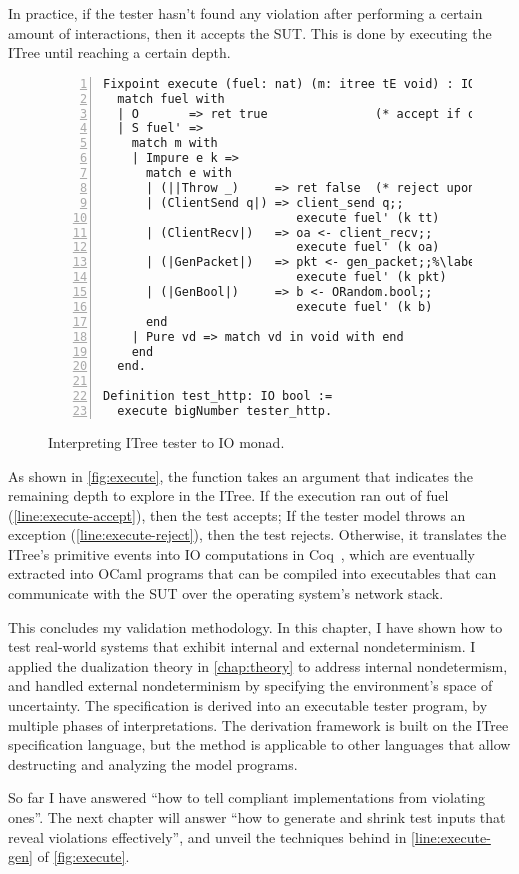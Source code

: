 In practice, if the tester hasn't found any violation after performing a certain
amount of interactions, then it accepts the SUT.  This is done by executing the
ITree until reaching a certain depth.

\begin{figure}
\begin{lstlisting}[numbers=left]
Fixpoint execute (fuel: nat) (m: itree tE void) : IO bool :=
  match fuel with
  | O       => ret true               (* accept if out of fuel *)%\label{line:execute-accept}%
  | S fuel' =>
    match m with
    | Impure e k =>
      match e with
      | (||Throw _)     => ret false  (* reject upon exception *)%\label{line:execute-reject}%
      | (ClientSend q|) => client_send q;;
                           execute fuel' (k tt)
      | (ClientRecv|)   => oa <- client_recv;;
                           execute fuel' (k oa)
      | (|GenPacket|)   => pkt <- gen_packet;;%\label{line:execute-gen}%
                           execute fuel' (k pkt)
      | (|GenBool|)     => b <- ORandom.bool;;
                           execute fuel' (k b)
      end
    | Pure vd => match vd in void with end
    end
  end.

Definition test_http: IO bool :=
  execute bigNumber tester_http.
\end{lstlisting}
\caption{Interpreting ITree tester to IO monad.}
\label{fig:execute}
\end{figure}

As shown in \autoref{fig:execute}, the  function takes an
argument  that indicates the remaining depth to explore in the ITree.
If the execution ran out of fuel (\autoref{line:execute-accept}), then the test
accepts; If the tester model throws an exception
(\autoref{line:execute-reject}), then the test rejects.  Otherwise, it
translates the ITree's primitive events into IO computations in
Coq~\cite{SimpleIO}, which are eventually extracted into OCaml programs that can
be compiled into executables that can communicate with the SUT over the
operating system's network stack.

This concludes my validation methodology.  In this chapter, I have shown how to
test real-world systems that exhibit internal and external nondeterminism.  I
applied the dualization theory in \autoref{chap:theory} to address internal
nondetermism, and handled external nondeterminism by specifying the
environment's space of uncertainty.  The specification is derived into an
executable tester program, by multiple phases of interpretations.  The
derivation framework is built on the ITree specification language, but the
method is applicable to other languages that allow destructing and analyzing the
model programs.

So far I have answered ``how to tell compliant implementations from violating
ones''.  The next chapter will answer ``how to generate and shrink test inputs
that reveal violations effectively'', and unveil the techniques behind
 in \autoref{line:execute-gen} of \autoref{fig:execute}.


